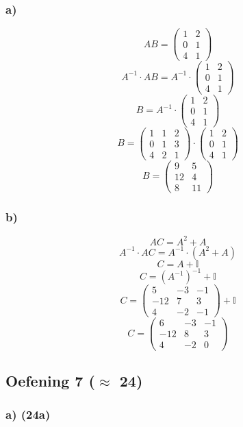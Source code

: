 \documentclass[lineaire_algebra_oplossingen.tex]{subfiles}
\begin{document}
\subsubsection*{a)}
$$ AB =
\begin{pmatrix}
1 & 2 \\
0 & 1 \\
4 & 1
\end{pmatrix}
$$
$$ A^{-1} \cdot AB = A^{-1} \cdot 
\begin{pmatrix}
1 & 2 \\
0 & 1 \\
4 & 1
\end{pmatrix}
$$
$$ B = A^{-1} \cdot
\begin{pmatrix}
1 & 2 \\
0 & 1 \\
4 & 1
\end{pmatrix}
$$
$$ B = 
\begin{pmatrix}
1 & 1 & 2 \\
0 & 1 & 3 \\
4 & 2 & 1
\end{pmatrix}
\cdot
\begin{pmatrix}
1 & 2 \\
0 & 1 \\
4 & 1
\end{pmatrix}
$$
$$ B = 
\begin{pmatrix}
9 & 5 \\
12 & 4 \\
8 & 11
\end{pmatrix}
$$
\subsubsection*{b)}
$$ AC = A^2 + A$$
$$ A^{-1} \cdot AC = A^{-1} \cdot (A^2 + A)$$
$$ C = A + \mathbb{I} $$
$$ C = (A^{-1})^{-1} + \mathbb{I} $$
$$ C = 
\begin{pmatrix}
5 & -3 & -1 \\
-12 & 7 & 3 \\
4 & -2 & -1
\end{pmatrix}
+ \mathbb{I} $$
$$ C = 
\begin{pmatrix}
6 & -3 & -1 \\
-12 & 8 & 3 \\
4 & -2 & 0
\end{pmatrix}
$$
\subsection{Oefening 7 ($\approx$ 24)}
\subsubsection*{a) (24a)}
\end{document}
